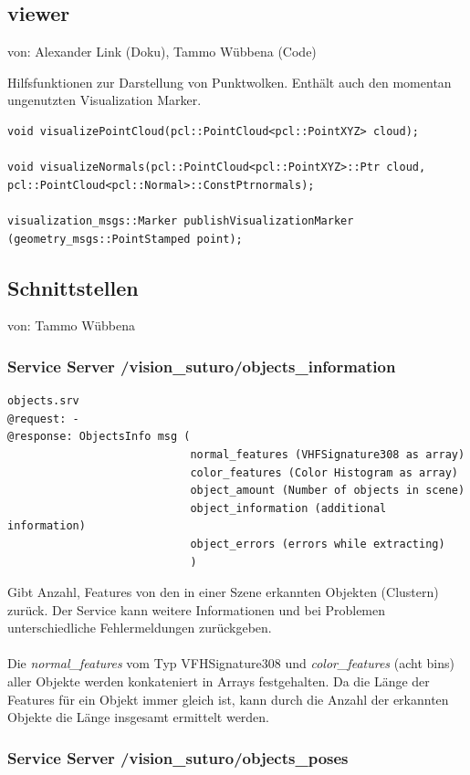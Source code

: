 \documentclass{suturo}
\makeatletter
\newcommand{\chapterauthor}[1]{%
  {\parindent0pt\vspace*{-27pt}%
  \linespread{0}\small\begin{flushright}von: #1\end{flushright}%
  \par\nobreak\vspace*{0pt}}
  \@afterheading%
}
\makeatother
\begin{document}
\subsection*{viewer}
\chapterauthor{Alexander Link (Doku), Tammo Wübbena (Code)}
Hilfsfunktionen zur Darstellung von Punktwolken.
Enthält auch den momentan ungenutzten Visualization Marker.

\begin{verbatim}
void visualizePointCloud(pcl::PointCloud<pcl::PointXYZ> cloud);

void visualizeNormals(pcl::PointCloud<pcl::PointXYZ>::Ptr cloud,
pcl::PointCloud<pcl::Normal>::ConstPtrnormals);

visualization_msgs::Marker publishVisualizationMarker
(geometry_msgs::PointStamped point);
\end{verbatim}


\subsection{Schnittstellen}
\chapterauthor{Tammo Wübbena}

\subsubsection{Service Server /vision\_suturo/objects\_information}
\begin{verbatim}
objects.srv
@request: -
@response: ObjectsInfo msg (
							normal_features (VHFSignature308 as array)
							color_features (Color Histogram as array)
							object_amount (Number of objects in scene)
							object_information (additional information)
							object_errors (errors while extracting)
							)
\end{verbatim}
Gibt Anzahl, Features von den in einer Szene erkannten Objekten (Clustern) zurück. Der Service kann weitere Informationen und bei Problemen unterschiedliche Fehlermeldungen zurückgeben.
\\ \\
Die \textit{normal\_features} vom Typ VFHSignature308 und \textit{color\_features} (acht bins) aller Objekte werden konkateniert in Arrays festgehalten. 
Da die Länge der Features für ein Objekt immer gleich ist, kann durch die Anzahl der erkannten Objekte die Länge insgesamt ermittelt werden.

\subsubsection{Service Server /vision\_suturo/objects\_poses}
\end{document}
